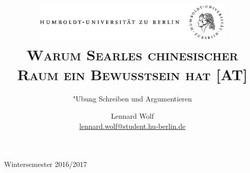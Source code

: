 \documentclass[a4paper, emulatestandardclasses, 12pt]{scrartcl}
\date{\vspace{-3ex}}
\begin{document}
\title{\vspace{5ex}
	\includegraphics*[width=0.72\textwidth]{images/hu_logo.png}\\
	\vspace{30pt}
	\scshape\LARGE{Warum Searles chinesischer\\Raum ein Bewusstsein hat [AT]}}
	
	\subtitle{\vspace{20pt}"Ubung Schreiben und Argumentieren\\
          }

\author{\vspace{-4pt}Lennard Wolf\\
        \small{\href{mailto:lennard.wolf@student.hu-berlin.de}{lennard.wolf@student.hu-berlin.de}}}      

\maketitle

\vspace{\fill}

\begin{minipage}[b]{\textwidth}
    \centering
    \onehalfspacing
    \large   
    Wintersemester 2016/2017

    \vspace{-20mm} 
\end{minipage}%
\thispagestyle{empty}
\newpage
\clearpage
\setcounter{page}{1}
\end{document}
